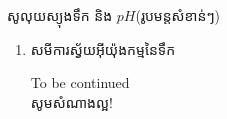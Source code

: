\documentclass[12pt, a4paper]{article}
\begin{document}
	\begin{center}
		\sffamily\color{black}
		សូលុយស្យុងទឹក និង $pH$(រូបមន្តសំខាន់ៗ)
	\end{center}
\maketitle
\begin{enumerate}[m, 2]
	\item សមីការស្វ័យអ៊ីយ៉ុងកម្មនៃទឹក
	\begin{equation}
	\end{equation}
	\begin{center}
		To be continued\\
		\sffamily\color{black}
		សូមសំណាងល្អ!
	\end{center}\newpage
\end{enumerate}
	
\end{document}
